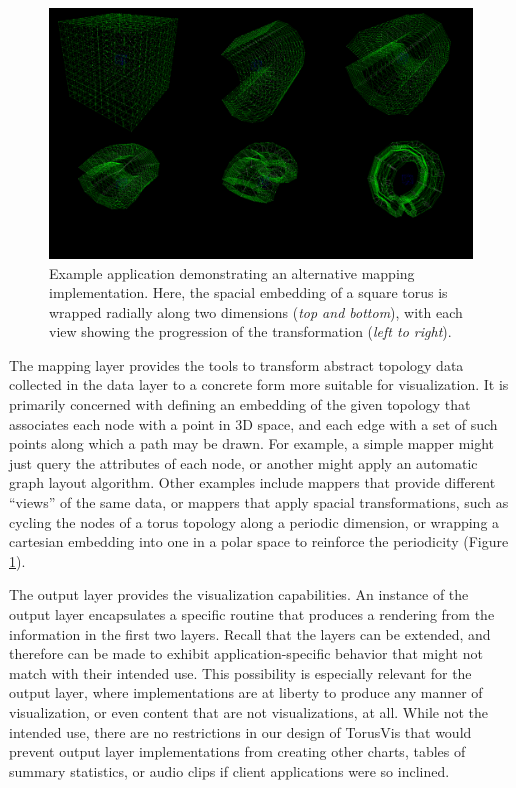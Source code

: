 \documentclass[
    10pt,
    conference,
    compsocconf
]{IEEEtran}
\begin{document}
        \begin{figure}[!t]
            \centering
            \includegraphics[width=6.5in]{torus}
            \caption{
                Example application demonstrating an alternative mapping
                implementation.  Here, the spacial embedding of a square torus
                is wrapped radially along two dimensions (\emph{top and
                bottom}), with each view showing the progression of the
                transformation (\emph{left to right}).
                }
            \label{fig_torus}
        \end{figure}
  
        The mapping layer provides the tools to transform abstract topology data
        collected in the data layer to a concrete form more suitable for
        visualization.  It is primarily concerned with defining an embedding of
        the given topology that associates each node with a point in 3D space,
        and each edge with a set of such points along which a path may be drawn.
        For example, a simple mapper might just query the attributes of each
        node, or another might apply an automatic graph layout algorithm.  Other
        examples include mappers that provide different ``views'' of the same
        data, or mappers that apply spacial transformations, such as cycling the
        nodes of a torus topology along a periodic dimension, or wrapping a
        cartesian embedding into one in a polar space to reinforce the
        periodicity (Figure \ref{fig_torus}).

        The output layer provides the visualization capabilities.  An instance
        of the output layer encapsulates a specific routine that produces a
        rendering from the information in the first two layers.  Recall that the
        layers can be extended, and therefore can be made to exhibit
        application-specific behavior that might not match with their intended
        use.  This possibility is especially relevant for the output layer,
        where implementations are at liberty to produce any manner of
        visualization, or even content that are not visualizations, at all.
        While not the intended use, there are no restrictions in our design of
        TorusVis that would prevent output layer implementations from creating
        other charts, tables of summary statistics, or audio clips if client
        applications were so inclined.
\end{document}
